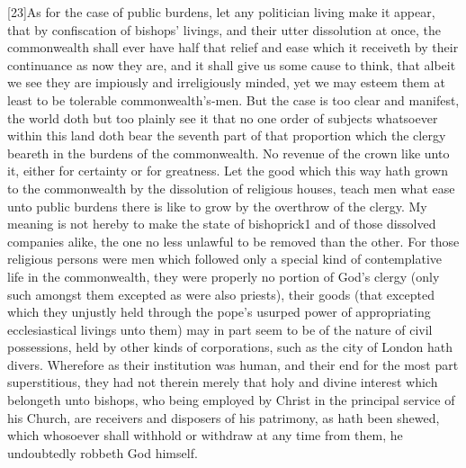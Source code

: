 [23]As for the case of public burdens, let any politician living make it appear, that by confiscation of bishops’ livings, and their utter dissolution at once, the commonwealth shall ever have half that relief and ease which it receiveth by their continuance as now they are, and it shall give us some cause to think, that albeit we see they are impiously and irreligiously minded, yet we may esteem them at least to be tolerable commonwealth’s-men. But the case is too clear and manifest, the world doth but too plainly see it that no one order of subjects whatsoever within this land doth bear the seventh part of that proportion which the clergy beareth in the burdens of the commonwealth. No revenue of the crown like unto it, either for certainty or for greatness. Let the good which this way hath grown to the commonwealth by the dissolution of religious houses, teach men what ease unto public burdens there is like to grow by the overthrow of the clergy. My meaning is not hereby to make the state of bishoprick1 and of those dissolved companies alike, the one no less unlawful to be removed than the other. For those religious persons were men which followed only a special kind of contemplative life in the commonwealth, they were properly no portion of God’s clergy (only such amongst them excepted as were also priests), their goods (that excepted which they unjustly held through the pope’s usurped power of appropriating ecclesiastical livings unto them) may in part seem to be of the nature of civil possessions, held by other kinds of corporations, such as the city of London hath divers. Wherefore as their institution was human, and their end for the most part superstitious, they had not therein merely that holy and divine interest which belongeth unto bishops, who being employed by Christ in the principal service of his Church, are receivers and disposers of his patrimony, as hath been shewed, which whosoever shall withhold or withdraw at any time from them, he undoubtedly robbeth God himself.

